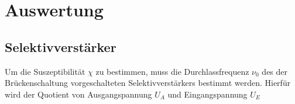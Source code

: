 \section{Auswertung}
\label{sec:Auswertung}
\subsection{Selektivverstärker}
Um die Suszeptibilität $\chi$ zu bestimmen, muss die
Durchlassfrequenz $\nu_0$ des der Brückenschaltung
vorgeschalteten Selektivverstärkers
bestimmt werden. Hierfür wird der Quotient von Ausgangspannung $U_A$
und Eingangspannung $U_E$
